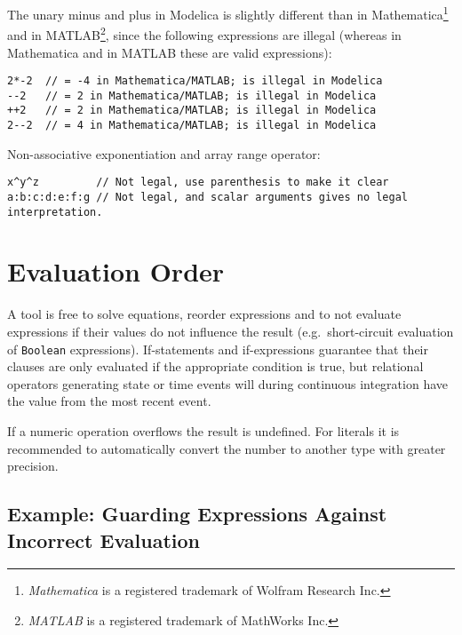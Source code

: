 \begin{nonnormative}
The unary minus and plus in Modelica is slightly different than in Mathematica\footnote{\emph{Mathematica} is a registered trademark of Wolfram Research Inc.} and in MATLAB\footnote{\emph{MATLAB} is
a registered trademark of MathWorks Inc.}, since the following expressions are illegal (whereas in Mathematica and in MATLAB these are valid expressions):
\begin{lstlisting}[language=modelica]
2*-2  // = -4 in Mathematica/MATLAB; is illegal in Modelica
--2   // = 2 in Mathematica/MATLAB; is illegal in Modelica
++2   // = 2 in Mathematica/MATLAB; is illegal in Modelica
2--2  // = 4 in Mathematica/MATLAB; is illegal in Modelica
\end{lstlisting}

Non-associative exponentiation and array range operator:
\begin{lstlisting}[language=modelica]
x^y^z         // Not legal, use parenthesis to make it clear
a:b:c:d:e:f:g // Not legal, and scalar arguments gives no legal interpretation.
\end{lstlisting}
\end{nonnormative}

\section{Evaluation Order}\label{evaluation-order}

A tool is free to solve equations, reorder expressions and to not evaluate expressions if their values do not influence the result (e.g.\ short-circuit
evaluation of \lstinline!Boolean! expressions).  If-statements and if-expressions guarantee that their clauses are only evaluated if the appropriate condition is true,
but relational operators generating state or time events will during continuous integration have the value from the most recent event.

If a numeric operation overflows the result is undefined. For literals
it is recommended to automatically convert the number to another type
with greater precision.

\subsection{Example: Guarding Expressions Against Incorrect Evaluation}\label{example-guarding-expressions-against-incorrect-evaluation}


